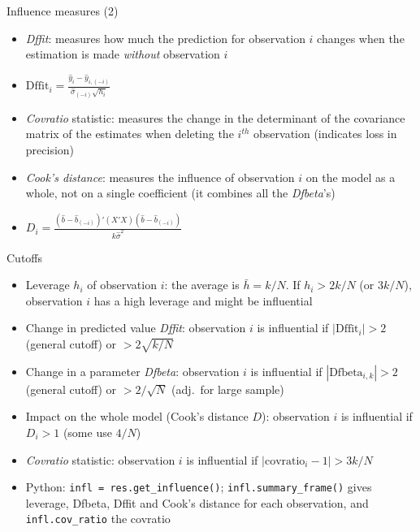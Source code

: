 \documentclass[aspectratio=169]{beamer}
\begin{document}
\begin{frame}{Influence measures (2)}
\begin{itemize}
    \item \textit{Dffit}: measures how much the prediction for observation $i$ changes when the estimation is made \textit{without} observation $i$
    \item $\text{Dffit}_i = \frac{\hat{y}_i-\hat{y}_{i,(-i)}}{\hat{\sigma}_{(-i)}\sqrt{h_i}}$
    \item \textit{Covratio} statistic: measures the change in the determinant of the covariance matrix of the estimates when deleting the $i^{th}$ observation (indicates loss in precision)
    \item \textit{Cook's distance}: measures the influence of observation $i$ on the model as a whole, not on a single coefficient (it combines all the \textit{Dfbeta}'s)
    \item $D_i = \frac{(\hat{b}-\hat{b}_{(-i)})'(X'X)(\hat{b}-\hat{b}_{(-i)})}{k\hat{\sigma}^2}$
\end{itemize}
\end{frame}

\begin{frame}{Cutoffs}
\begin{itemize}
    \item Leverage $h_i$ of observation $i$: the average is $\bar{h} = k/N$. If $h_i > 2k/N$ (or $3k/N$), observation $i$ has a high leverage and might be influential
    \item Change in predicted value \textit{Dffit}: observation $i$ is influential if $|\text{Dffit}_i| > 2$ (general cutoff) or $> 2\sqrt{k/N}$
    \item Change in a parameter \textit{Dfbeta}: observation $i$ is influential if $|\text{Dfbeta}_{i,k}| > 2$ (general cutoff) or $> 2/\sqrt{N}$ (adj.\ for large sample)
    \item Impact on the whole model (Cook's distance $D$): observation $i$ is influential if $D_i > 1$ (some use $4/N$)
    \item \textit{Covratio} statistic: observation $i$ is influential if $|\text{covratio}_i - 1| > 3k/N$
    \item Python: \texttt{infl = res.get\_influence()}; \texttt{infl.summary\_frame()} gives leverage, Dfbeta, Dffit and Cook's distance for each observation, and \texttt{infl.cov\_ratio} the covratio
\end{itemize}
\end{frame}
\end{document}
